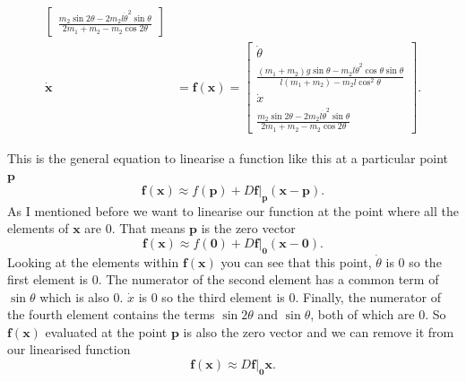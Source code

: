 \documentclass{article}
\renewcommand{\vec}[1]{\boldsymbol{\mathbf{#1}}}
\newcommand{\dvec}[1]{\dot{\vec{#1}}}
\begin{document}
\begin{align*}
\begin{bmatrix}
                                         \frac{m_2 \sin 2 \theta - 2 m_2 l \dot{\theta}^2 \sin \theta}{2 m_1 + m_2 - m_2 \cos 2 \theta}
                                       \end{bmatrix}    \\
  \dvec{x}         & = \vec{f}(\vec{x}) = \begin{bmatrix}
                                            \dot{\theta}                                                                                                         \\
                                            \frac{(m_1 + m_2) g \sin \theta - m_2 l \dot{\theta}^2 \cos \theta \sin \theta}{l (m_1 + m_2) - m_2 l \cos^2 \theta} \\
                                            \dot{x}                                                                                                              \\
                                            \frac{m_2 \sin 2 \theta - 2 m_2 l \dot{\theta}^2 \sin \theta}{2 m_1 + m_2 - m_2 \cos 2 \theta}
                                          \end{bmatrix}.
\end{align*}

This is the general equation to linearise a function like this at a particular point $\vec{p}$ \[\vec{f}(\vec{x}) \approx f(\vec{p}) + D \vec{f}|_{\vec{p}} (\vec{x} - \vec{p}).\] As I mentioned before we want to linearise our function at the point where all the elements of $\vec{x}$ are $0$. That means $\vec{p}$ is the zero vector \[\vec{f}(\vec{x}) \approx f(\vec{0}) + D \vec{f}|_{\vec{0}} (\vec{x} - \vec{0}).\] Looking at the elements within $\vec{f}(\vec{x})$ you can see that this point, $\dot{\theta}$ is $0$ so the first element is $0$. The numerator of the second element has a common term of $\sin \theta$ which is also $0$. $\dot{x}$ is $0$ so the third element is $0$. Finally, the numerator of the fourth element contains the terms $\sin 2 \theta$ and $\sin \theta$, both of which are $0$. So $\vec{f}(\vec{x})$ evaluated at the point $\vec{p}$ is also the zero vector and we can remove it from our linearised function \[\vec{f}(\vec{x}) \approx D \vec{f}|_{\vec{0}} \vec{x}.\]
\end{document}
